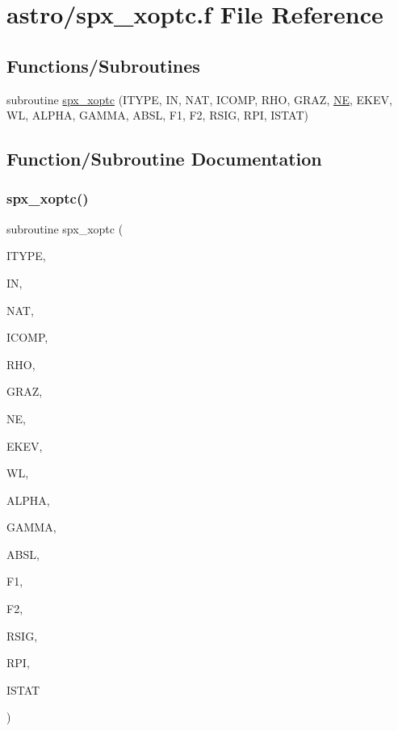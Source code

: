 \hypertarget{spx__xoptc_8f}{}\section{astro/spx\+\_\+xoptc.f File Reference}
\label{spx__xoptc_8f}
\subsection*{Functions/\+Subroutines}
\begin{DoxyCompactItemize}
\item 
subroutine \hyperlink{spx__xoptc_8f_aa2e0c626d7c3f6c49d76332ee45f4470}{spx\+\_\+xoptc} (I\+T\+Y\+PE, IN, N\+AT, I\+C\+O\+MP, R\+HO, G\+R\+AZ, \hyperlink{eval__tab_8h_a5af9139e882aef6c820ae908589a40d6}{NE}, E\+K\+EV, WL, A\+L\+P\+HA, G\+A\+M\+MA, A\+B\+SL, F1, F2, R\+S\+IG, R\+PI, I\+S\+T\+AT)
\end{DoxyCompactItemize}


\subsection{Function/\+Subroutine Documentation}
\mbox{\label{spx__xoptc_8f_aa2e0c626d7c3f6c49d76332ee45f4470}} 
\subsubsection{\texorpdfstring{spx\+\_\+xoptc()}{spx\_xoptc()}}
{\footnotesize\ttfamily subroutine spx\+\_\+xoptc (\begin{DoxyParamCaption}\item[{integer}]{I\+T\+Y\+PE,  }\item[{integer}]{IN,  }\item[{integer}]{N\+AT,  }\item[{integer, dimension(nat)}]{I\+C\+O\+MP,  }\item[{double precision}]{R\+HO,  }\item[{double precision}]{G\+R\+AZ,  }\item[{integer}]{NE,  }\item[{double precision, dimension(ne)}]{E\+K\+EV,  }\item[{double precision, dimension(ne)}]{WL,  }\item[{double precision, dimension(ne)}]{A\+L\+P\+HA,  }\item[{double precision, dimension(ne)}]{G\+A\+M\+MA,  }\item[{double precision, dimension(ne)}]{A\+B\+SL,  }\item[{double precision, dimension(ne)}]{F1,  }\item[{double precision, dimension(ne)}]{F2,  }\item[{double precision, dimension(ne)}]{R\+S\+IG,  }\item[{double precision, dimension(ne)}]{R\+PI,  }\item[{integer}]{I\+S\+T\+AT }\end{DoxyParamCaption})}

